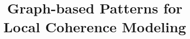 \title{Graph-based Patterns for \\ Local Coherence Modeling}

\publishers{{\normalsize vorgelegt von} \\ Mohsen Mesgar}
 
\date{} 

\titlehead{Inauguraldissertation zur Erlangung der Doktorwürde der Neuphilologischen Fakultät der Ruprecht-Karls-Universität Heidelberg} 

\lowertitleback{Referent: Prof.\ Dr.\ Michael Strube\\ Korreferent: Prof.\ Dr.\ Katja Markert\\ Einreichung: September 2018}



